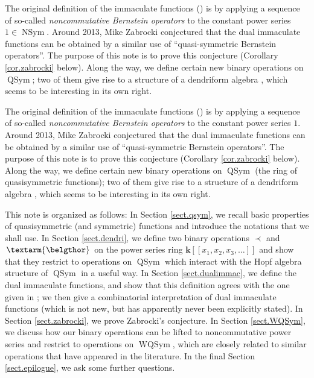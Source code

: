 \documentclass
[numbers=enddot,12pt,final,onecolumn,notitlepage,abstracton]{scrartcl}%
\theoremstyle{definition}
\newenvironment{verlong}{}{}
\newenvironment{vershort}{}{}
\newcommand{\bel}{\left. \textarm{\belgthor} \right.}
\begin{document}
\begin{vershort}
The original definition of the immaculate functions (\cite[Definition
3.2]{BBSSZ}) is by applying a sequence of so-called \textit{noncommutative
Bernstein operators} to the constant power series $1\in\operatorname*{NSym}$.
Around 2013, Mike Zabrocki conjectured that the dual immaculate functions can
be obtained by a similar use of \textquotedblleft quasi-symmetric Bernstein
operators\textquotedblright. The purpose of this note is to prove this
conjecture (Corollary \ref{cor.zabrocki} below). Along the way, we define
certain new binary operations on $\operatorname*{QSym}$; two of them give rise
to a structure of a dendriform algebra \cite{EbrFar08}, which seems to be
interesting in its own right.
\end{vershort}

\begin{verlong}
The original definition of the immaculate functions (\cite[Definition
3.2]{BBSSZ}) is by applying a sequence of so-called \textit{noncommutative
Bernstein operators} to the constant power series $1$. Around 2013, Mike
Zabrocki conjectured that the dual immaculate functions can be obtained by a
similar use of \textquotedblleft quasi-symmetric Bernstein
operators\textquotedblright. The purpose of this note is to prove this
conjecture (Corollary \ref{cor.zabrocki} below). Along the way, we define
certain new binary operations on $\operatorname*{QSym}$ (the ring of
quasisymmetric functions); two of them give rise to a structure of a
dendriform algebra \cite{EbrFar08}, which seems to be interesting in its own right.
\end{verlong}

This note is organized as follows: In Section \ref{sect.qsym}, we recall basic
properties of quasisymmetric (and symmetric) functions and introduce the
notations that we shall use. In Section \ref{sect.dendri}, we define two
binary operations $\left.  \prec\right.  $ and $\bel $ on the power series
ring $\mathbf{k}\left[  \left[  x_{1},x_{2},x_{3},\ldots\right]  \right]  $
and show that they restrict to operations on $\operatorname*{QSym}$ which
interact with the Hopf algebra structure of $\operatorname*{QSym}$ in a useful
way. In Section \ref{sect.dualimmac}, we define the dual immaculate functions,
and show that this definition agrees with the one given in \cite[Remark
3.28]{BBSSZ}; we then give a combinatorial interpretation of dual immaculate
functions (which is not new, but has apparently never been explicitly stated).
In Section \ref{sect.zabrocki}, we prove Zabrocki's conjecture. In Section
\ref{sect.WQSym}, we discuss how our binary operations can be lifted to
noncommutative power series and restrict to operations on
$\operatorname*{WQSym}$, which are closely related to similar operations that
have appeared in the literature. In the final Section \ref{sect.epilogue}, we
ask some further questions.
\end{document}
